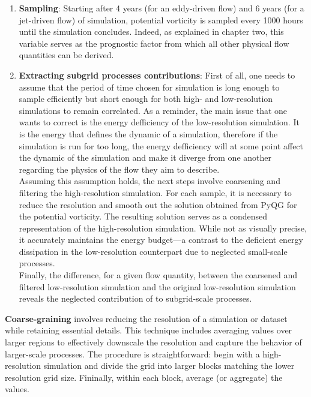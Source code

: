 \begin{enumerate}
	\vspace{0.5em}
	
	\item\textbf{Sampling}: Starting after 4 years (for an eddy-driven flow) and 6 years (for a jet-driven flow) of simulation, potential vorticity is sampled every 1000 hours until the simulation concludes. Indeed, as explained in chapter two, this variable serves as the prognostic factor from which all other physical flow quantities can be derived.
	
	\vspace{0.5em}
	
	\item\textbf{Extracting subgrid processes contributions}: First of all, one needs to assume that the period of time chosen for simulation is long enough to sample efficiently but short enough for both high- and low-resolution simulations to remain correlated. 	As a reminder, the main issue that one wants to correct is the energy defficiency of the low-resolution simulation. It is the energy that defines the dynamic of a simulation, therefore if the simulation is run for too long, the energy defficiency will at some point affect the dynamic of the simulation and make it diverge from one another regarding the physics of the flow they aim to describe.\\
	
Assuming this assumption holds, the next steps involve coarsening and filtering the high-resolution simulation. For each sample, it is necessary to reduce the resolution and smooth out the solution obtained from PyQG for the potential vorticity. The resulting solution serves as a condensed representation of the high-resolution simulation. While not as visually precise, it accurately maintains the energy budget—a contrast to the deficient energy dissipation in the low-resolution counterpart due to neglected small-scale processes.\\

Finally, the difference, for a given flow quantity, between the coarsened and filtered low-resolution simulation and the original low-resolution simulation reveals the neglected contribution of to subgrid-scale processes.
 
\end{enumerate} 
\vspace{0.25em}


\textbf{Coarse-graining }involves reducing the resolution of a simulation or dataset while retaining essential details. This technique includes averaging values over larger regions to effectively downscale the resolution and capture the behavior of larger-scale processes. The procedure is straightforward: begin with a high-resolution simulation and divide the grid into larger blocks matching the lower resolution grid size. Fininally, within each block, average (or aggregate) the values.

